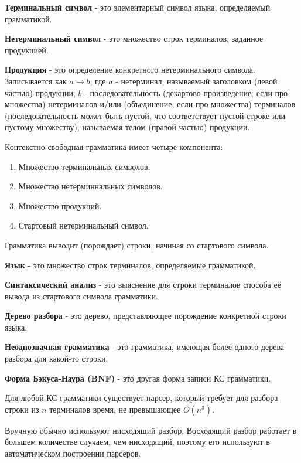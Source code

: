 \documentclass[oneside]{book}
\begin{document}
    \textbf{Терминальный символ} - это элементарный символ языка,
    определяемый грамматикой.

    \textbf{Нетерминальный символ} - это множество строк терминалов,
    заданное продукцией.

    \textbf{Продукция} - это определение конкретного нетерминального символа.
    Записывается как $ a \rightarrow b $,
    где $ a $ - нетерминал, называемый заголовком
    (левой частью) продукции, $ b $ - последовательность
    (декартово произведение, если про множества)
    нетерминалов и/или (объединение, если про множества) терминалов
    (последовательность может быть пустой, что соответствует пустой строке или
    пустому множеству), называемая телом (правой частью) продукции.

    Контекстно-свободная грамматика имеет четыре компонента:
    \begin{enumerate}
        \item Множество терминальных символов.
        \item Множество нетерминнальных символов.
        \item Множество продукций.
        \item Стартовый нетерминальный символ.
    \end{enumerate}

    Грамматика выводит (порождает) строки, начиная со стартового символа.

    \textbf{Язык} - это множество строк терминалов, определяемые грамматикой.

    \textbf{Синтаксический анализ} - это выяснение для строки терминалов
    способа её вывода из стартового символа грамматики.

    \textbf{Дерево разбора} - это дерево, представляющее
    порождение конкретной строки языка.

    \textbf{Неоднозначная грамматика} - это грамматика,
    имеющая более одного дерева разбора для какой-то строки.

    \textbf{Форма Бэкуса-Наура (BNF)} - это другая форма записи КС грамматики.

    Для любой КС грамматики существует парсер, который требует для разбора
    строки из $ n $ терминалов время, не превышающее $ O\left(n^3\right) $.

    Вручную обычно используют нисходящий разбор.
    Восходящий разбор работает в большем количестве случаем, чем нисходящий,
    поэтому его используют в автоматическом построении парсеров.
\end{document}
